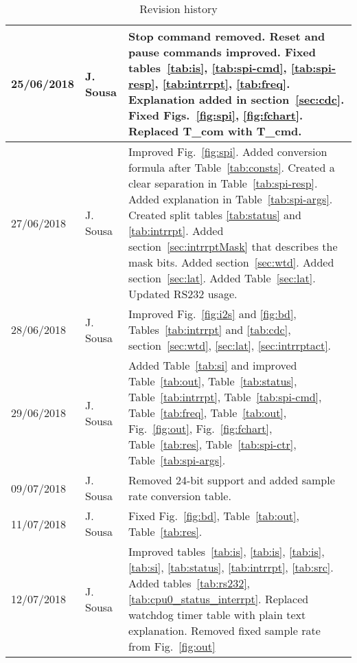 \documentclass{ug}
\theoremstyle{plain}
\begin{document}
\begin{table}[H]
\begin{center}
\begin{tabular}{|l|l|p{8cm}|}
      25/06/2018 & J. Sousa & Stop command removed. Reset and pause commands
      improved.  Fixed tables~\ref{tab:is}, \ref{tab:spi-cmd},
      \ref{tab:spi-resp}, \ref{tab:intrrpt}, \ref{tab:freq}.  Explanation added
      in section~\ref{sec:cdc}. Fixed Figs.~\ref{fig:spi},
      \ref{fig:fchart}. Replaced T\_com with T\_cmd.\\ \hline

      \rowcolor{iob-blue} 27/06/2018 & J. Sousa & Improved
      Fig.~\ref{fig:spi}. Added conversion formula after
      Table~\ref{tab:consts}. Created a clear separation in
      Table~\ref{tab:spi-resp}. Added explanation in Table~\ref{tab:spi-args}.
      Created split tables \ref{tab:status} and \ref{tab:intrrpt}. Added
      section~\ref{sec:intrrptMask} that describes the mask bits. Added
      section~\ref{sec:wtd}. Added section~\ref{sec:lat}. Added
      Table~\ref{sec:lat}. Updated RS232 usage.\\ \hline

      28/06/2018 & J. Sousa & Improved Fig.~\ref{fig:i2s} and \ref{fig:bd},
      Tables~\ref{tab:intrrpt} and \ref{tab:cdc}, section~\ref{sec:wtd},
      \ref{sec:lat}, \ref{sec:intrrptact}. \\ \hline

      \rowcolor{iob-blue} 29/06/2018 & J. Sousa & Added Table~\ref{tab:si} and improved
      Table~\ref{tab:out}, Table~\ref{tab:status}, Table~\ref{tab:intrrpt},
      Table~\ref{tab:spi-cmd}, Table~\ref{tab:freq}, Table~\ref{tab:out},
      Fig.~\ref{fig:out}, Fig.~\ref{fig:fchart}, Table~\ref{tab:res},
      Table~\ref{tab:spi-ctr}, Table~\ref{tab:spi-args}.\\ \hline

      09/07/2018 & J. Sousa & Removed 24-bit support and added sample
      rate conversion table.\\ \hline

      \rowcolor{iob-blue} 11/07/2018 & J. Sousa & Fixed Fig.~\ref{fig:bd},
      Table~\ref{tab:out}, Table~\ref{tab:res}.\\ \hline

      12/07/2018 & J. Sousa & Improved
      tables~\ref{tab:is}, \ref{tab:is}, \ref{tab:is}, \ref{tab:si},
      \ref{tab:status}, \ref{tab:intrrpt}, \ref{tab:src}.  Added
      tables~\ref{tab:rs232},\ref{tab:cpu0_status_interrpt}. Replaced
      watchdog timer table with plain text explanation. Removed fixed
      sample rate from Fig.~\ref{fig:out}\\ \hline
      
    \end{tabular}
    \caption{Revision history}
  \end{center}
\end{table}
\clearpage
\end{document}
